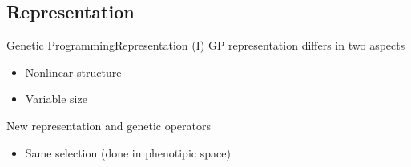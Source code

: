 \documentclass[10pt,compress]{beamer} %
\begin{document}
\subsection{Representation}
\begin{frame}{Genetic Programming}{Representation (I)}
	GP representation differs in two aspects
	\begin{itemize}
		\item Nonlinear structure
		\item Variable size
	\end{itemize}
	New representation and genetic operators
	\begin{itemize}
		\item Same selection (done in phenotipic space)
	\end{itemize}
\end{frame}
\end{document}
